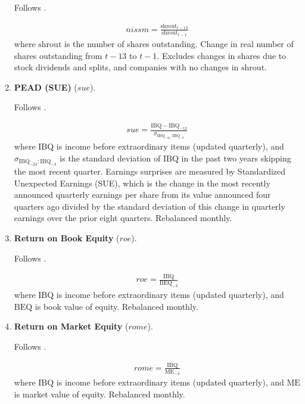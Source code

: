 \begin{enumerate}
	Follows . 
	
	\begin{align*}
		nissm = \frac{ \mathrm{shrout}_{t-13} }{ \mathrm{shrout}_{t-1} }
	\end{align*}
	where $\mathrm{shrout}$ is the number of shares outstanding. Change in real number of shares outstanding from $t-13$ to $t-1$. Excludes changes in shares due to stock dividends and splits, and companies with no changes in $\mathrm{shrout}$.
	
	
	
	\item \textbf{PEAD (SUE)} ($sue$). 
	
	Follows . 
	
	\begin{align*}
		sue = \frac{ \mathrm{IBQ} - \mathrm{IBQ}_{-12} }{ \sigma_{\mathrm{IBQ}_{-24}:\mathrm{IBQ}_{-3} } }
	\end{align*}
	where $\mathrm{IBQ}$ is income before extraordinary items (updated quarterly), and $\sigma_{\mathrm{IBQ}_{-24}:\mathrm{IBQ}_{-3}}$ is the standard deviation of $\mathrm{IBQ}$ in the past two years skipping the most recent quarter. Earnings surprises are measured by Standardized Unexpected Earnings (SUE), which is the change in the most recently announced quarterly earnings per share from its value announced four quarters ago divided by the standard deviation of this change in quarterly earnings over the prior eight quarters. Rebalanced monthly.
	
	
	
	\item \textbf{Return on Book Equity} ($roe$). 
	
	Follows . 
	
	\begin{align*}
		roe = \frac{ \mathrm{IBQ} }{ \mathrm{BEQ}_{-3} }
	\end{align*}
	where $\mathrm{IBQ}$ is income before extraordinary items (updated quarterly), and $\mathrm{BEQ}$ is book value of equity. Rebalanced monthly.
	
	
	
	\item \textbf{Return on Market Equity} ($rome$). 
	
	Follows . 
	
	\begin{align*}
		rome = \frac{ \mathrm{IBQ} }{ \mathrm{ME}_{-4} }
	\end{align*}
	where $\mathrm{IBQ}$ is income before extraordinary items (updated quarterly), and $\mathrm{ME}$ is market value of equity. Rebalanced monthly.
	

\end{enumerate}
